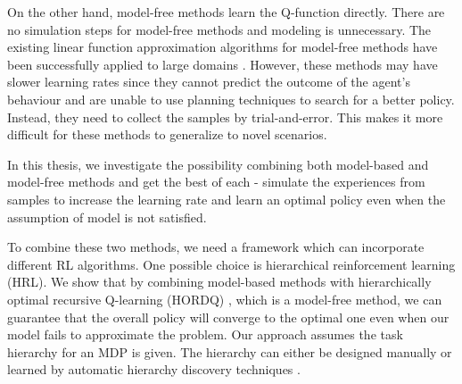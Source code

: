 On the other hand, model-free methods learn the Q-function directly. 
There are no simulation steps for model-free methods and modeling is unnecessary. 
The existing linear function approximation algorithms for model-free methods have been successfully 
applied to large domains \cite{LSTD99, KeepAway}. 
However, these methods may have slower learning rates since they cannot predict
the outcome of the agent's behaviour and are unable to use planning techniques to 
search for a better policy. Instead, they need to collect the samples by trial-and-error.
This makes it more difficult for these methods to generalize to novel scenarios.



In this thesis, we investigate the possibility combining both model-based and model-free methods 
and get the best of each - simulate the experiences from samples to increase the learning rate
and learn an optimal policy even when the assumption of model is not satisfied. 


To combine these two methods, we need a framework which can incorporate different RL algorithms.
One possible choice is hierarchical reinforcement learning (HRL). 
We show that by combining model-based methods with 
hierarchically optimal recursive Q-learning (HORDQ) \cite{HORDQ}, which is a model-free method, we can 
guarantee that the overall policy will converge to the optimal one even when our model
fails to approximate the problem. 
Our approach assumes the task hierarchy for an MDP is given. The hierarchy can either be 
designed manually or learned by automatic hierarchy discovery techniques \cite{HexQ}.



